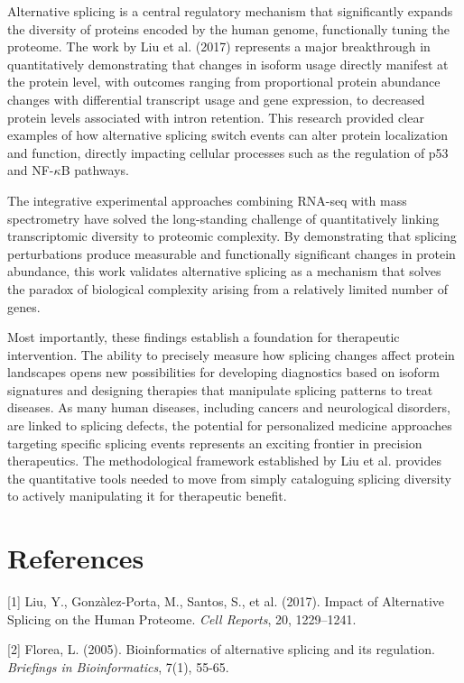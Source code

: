 \documentclass[12pt,a4paper]{article}
\begin{document}
Alternative splicing is a central regulatory mechanism that significantly expands the diversity of proteins encoded by the human genome, functionally tuning the proteome. The work by Liu et al. (2017) represents a major breakthrough in quantitatively demonstrating that changes in isoform usage directly manifest at the protein level, with outcomes ranging from proportional protein abundance changes with differential transcript usage and gene expression, to decreased protein levels associated with intron retention. This research provided clear examples of how alternative splicing switch events can alter protein localization and function, directly impacting cellular processes such as the regulation of p53 and NF-$\kappa$B pathways.

The integrative experimental approaches combining RNA-seq with mass spectrometry have solved the long-standing challenge of quantitatively linking transcriptomic diversity to proteomic complexity. By demonstrating that splicing perturbations produce measurable and functionally significant changes in protein abundance, this work validates alternative splicing as a mechanism that solves the paradox of biological complexity arising from a relatively limited number of genes.

Most importantly, these findings establish a foundation for therapeutic intervention. The ability to precisely measure how splicing changes affect protein landscapes opens new possibilities for developing diagnostics based on isoform signatures and designing therapies that manipulate splicing patterns to treat diseases. As many human diseases, including cancers and neurological disorders, are linked to splicing defects, the potential for personalized medicine approaches targeting specific splicing events represents an exciting frontier in precision therapeutics. The methodological framework established by Liu et al. provides the quantitative tools needed to move from simply cataloguing splicing diversity to actively manipulating it for therapeutic benefit.

\section{References}

[1] Liu, Y., Gonzàlez-Porta, M., Santos, S., et al. (2017). Impact of Alternative Splicing on the Human Proteome. \textit{Cell Reports}, 20, 1229–1241.

[2] Florea, L. (2005). Bioinformatics of alternative splicing and its regulation. \textit{Briefings in Bioinformatics}, 7(1), 55-65.
\end{document}

